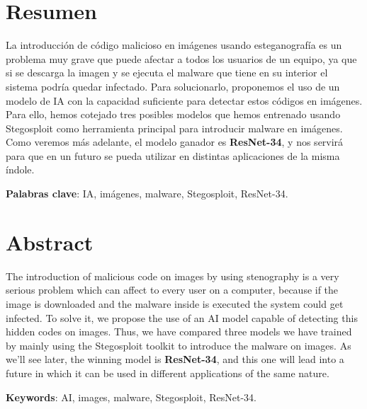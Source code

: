 \chapter{Resumen}

La introducción de código malicioso en imágenes usando esteganografía es un problema muy grave que puede afectar a todos los usuarios de un equipo, ya que si se descarga la imagen y se ejecuta el malware que tiene en su interior el sistema podría quedar infectado. Para solucionarlo, proponemos el uso de un modelo de \ac{IA} con la capacidad suficiente para detectar estos códigos en imágenes. Para ello, hemos cotejado tres posibles modelos que hemos entrenado usando Stegosploit como herramienta principal para introducir malware en imágenes. Como veremos más adelante, el modelo ganador es \textbf{ResNet-34}, y nos servirá para que en un futuro se pueda utilizar en distintas aplicaciones de la misma índole. %



\vspace{0.5cm}

\textbf{Palabras clave}: \ac{IA}, imágenes, malware, Stegosploit, ResNet-34.

\newpage
\thispagestyle{empty}
\hspace*{0.5cm}
\newpage

\chapter{Abstract}

The introduction of malicious code on images by using stenography is a very serious problem which can affect to every user on a computer, because if the image is downloaded and the malware inside is executed the system could get infected. To solve it, we propose the use of an AI model capable of detecting this hidden codes on images. Thus, we have compared three models we have trained by mainly using the Stegosploit toolkit to introduce the malware on images. As we'll see later, the winning model is \textbf{ResNet-34}, and this one will lead into a future in which it can be used in different applications of the same nature.

\vspace{0.5cm}

\textbf{Keywords}: AI, images, malware, Stegosploit, ResNet-34.
\newpage
\thispagestyle{empty}
\hspace*{0.5cm}
\newpage
